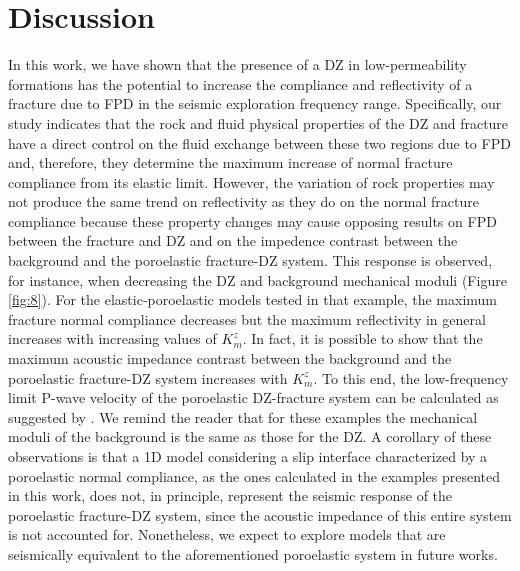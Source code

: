 \documentclass[draft]{agujournal2019}
\begin{document}
\section{Discussion}
In this work, we have shown that the presence of a DZ in low-permeability formations has the potential to increase the compliance and reflectivity of a fracture due to FPD in the seismic exploration frequency range. Specifically, our study indicates that the rock and fluid  physical properties of the DZ and fracture  have a direct control on the fluid exchange between these two regions due to FPD and, therefore, they determine the maximum increase of normal fracture compliance from its elastic limit.
However, the variation of rock properties may not produce the same trend on reflectivity as they do on the normal fracture compliance because these property changes may cause opposing results on FPD between the fracture and DZ and on the impedence contrast between the background and the poroelastic fracture-DZ system.
This response is observed, for instance, when decreasing the DZ and background mechanical moduli (Figure \ref{fig:8}). 
For the elastic-poroelastic models tested in that example, the maximum fracture normal compliance decreases but the maximum reflectivity in general increases with increasing values of $K_m^z$. In fact, it is possible to show that the maximum acoustic impedance contrast between the  background and the poroelastic fracture-DZ system increases with $K_m^z$. To this end,  the low-frequency limit P-wave velocity of the  poroelastic DZ-fracture system can be calculated as suggested by . We remind the reader that for these examples the mechanical moduli of the background is the same as those for the DZ. A corollary of these observations is that a 1D model considering a slip interface characterized by a poroelastic normal compliance, as the ones calculated in the examples presented in this work, does not, in principle, 
represent the seismic response of the poroelastic fracture-DZ system, since the acoustic impedance of this entire system is not accounted for. Nonetheless, we expect to explore models that are seismically equivalent to the aforementioned poroelastic system in future works.
\end{document}
